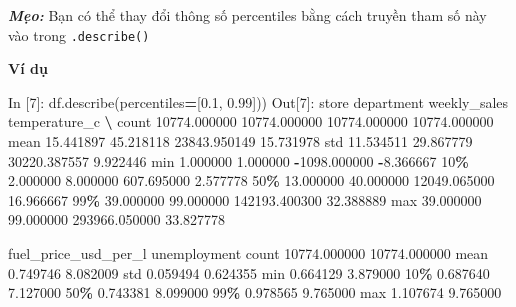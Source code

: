 \documentclass[
]{book}
\makeatletter
\newenvironment{Shaded}{\begin{snugshade}}{\end{snugshade}}
\newcommand{\BuiltInTok}[1]{#1}
\newcommand{\DecValTok}[1]{\textcolor[rgb]{0.00,0.00,0.81}{#1}}
\newcommand{\FloatTok}[1]{\textcolor[rgb]{0.00,0.00,0.81}{#1}}
\newcommand{\NormalTok}[1]{#1}
\newcommand{\OperatorTok}[1]{\textcolor[rgb]{0.81,0.36,0.00}{\textbf{#1}}}
\newenvironment{kframe}{%
\medskip{}
\setlength{\fboxsep}{.8em}
 \def\at@end@of@kframe{}%
 \ifinner\ifhmode%
  \def\at@end@of@kframe{\end{minipage}}%
  \begin{minipage}{\columnwidth}%
 \fi\fi%
 \def\FrameCommand##1{\hskip\@totalleftmargin \hskip-\fboxsep
 \colorbox{shadecolor}{##1}\hskip-\fboxsep
     \hskip-\linewidth \hskip-\@totalleftmargin \hskip\columnwidth}%
 \MakeFramed {\advance\hsize-\width
   \@totalleftmargin\z@ \linewidth\hsize
   \@setminipage}}%
 {\par\unskip\endMakeFramed%
 \at@end@of@kframe}
\newenvironment{rmdblock}[1]
  {
  \begin{itemize}
  \renewcommand{\labelitemi}{
    \raisebox{-.7\height}[0pt][0pt]{
      {\setkeys{Gin}{width=3em,keepaspectratio}\texttt{[image: images/\#1]}}
    }
  }
  \setlength{\fboxsep}{1em}
  \begin{kframe}
  \item
  }
  {
  \end{kframe}
  \end{itemize}
  }
\newenvironment{rmdtip}
  {\begin{rmdblock}{tip}}
  {\end{rmdblock}}
\makeatother
\begin{document}
\begin{rmdtip}
\textbf{\emph{Mẹo:}}
Bạn có thể thay đổi thông số percentiles bằng cách truyền tham số này vào trong \texttt{.describe()}
\end{rmdtip}

\textbf{Ví dụ}

\begin{Shaded}
\begin{Highlighting}[]
\NormalTok{In [}\DecValTok{7}\NormalTok{]: df.describe(percentiles}\OperatorTok{=}\NormalTok{[}\FloatTok{0.1}\NormalTok{, }\FloatTok{0.99}\NormalTok{]))}
\NormalTok{Out[}\DecValTok{7}\NormalTok{]: }
\NormalTok{              store    department   weekly\_sales  temperature\_c  }\OperatorTok{\textbackslash{}}
\NormalTok{count  }\FloatTok{10774.000000}  \FloatTok{10774.000000}   \FloatTok{10774.000000}   \FloatTok{10774.000000}   
\NormalTok{mean      }\FloatTok{15.441897}     \FloatTok{45.218118}   \FloatTok{23843.950149}      \FloatTok{15.731978}   
\NormalTok{std       }\FloatTok{11.534511}     \FloatTok{29.867779}   \FloatTok{30220.387557}       \FloatTok{9.922446}   
\BuiltInTok{min}        \FloatTok{1.000000}      \FloatTok{1.000000}   \OperatorTok{{-}}\FloatTok{1098.000000}      \OperatorTok{{-}}\FloatTok{8.366667}   
\DecValTok{10}\OperatorTok{\%}        \FloatTok{2.000000}      \FloatTok{8.000000}     \FloatTok{607.695000}       \FloatTok{2.577778}   
\DecValTok{50}\OperatorTok{\%}       \FloatTok{13.000000}     \FloatTok{40.000000}   \FloatTok{12049.065000}      \FloatTok{16.966667}   
\DecValTok{99}\OperatorTok{\%}       \FloatTok{39.000000}     \FloatTok{99.000000}  \FloatTok{142193.400300}      \FloatTok{32.388889}   
\BuiltInTok{max}       \FloatTok{39.000000}     \FloatTok{99.000000}  \FloatTok{293966.050000}      \FloatTok{33.827778}   

\NormalTok{       fuel\_price\_usd\_per\_l  unemployment  }
\NormalTok{count          }\FloatTok{10774.000000}  \FloatTok{10774.000000}  
\NormalTok{mean               }\FloatTok{0.749746}      \FloatTok{8.082009}  
\NormalTok{std                }\FloatTok{0.059494}      \FloatTok{0.624355}  
\BuiltInTok{min}                \FloatTok{0.664129}      \FloatTok{3.879000}  
\DecValTok{10}\OperatorTok{\%}                \FloatTok{0.687640}      \FloatTok{7.127000}  
\DecValTok{50}\OperatorTok{\%}                \FloatTok{0.743381}      \FloatTok{8.099000}  
\DecValTok{99}\OperatorTok{\%}                \FloatTok{0.978565}      \FloatTok{9.765000}  
\BuiltInTok{max}                \FloatTok{1.107674}      \FloatTok{9.765000}   
\end{Highlighting}
\end{Shaded}
\end{document}
